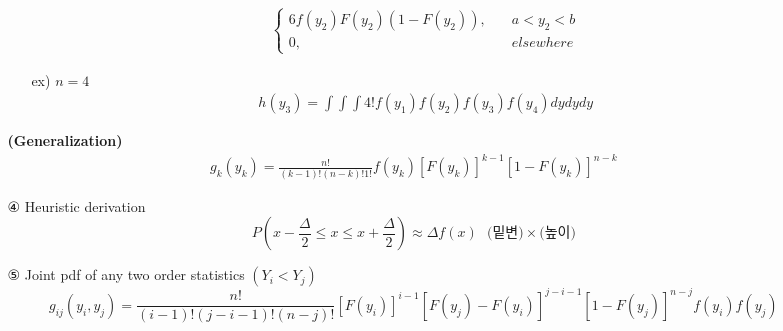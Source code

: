 \documentclass{oblivoir}
\begin{document}
\begin{itemize}
\begin{itemize}
\begin{itemize}
\begin{align*}
\begin{cases}
6f(y_2)F(y_2)(1-F(y_2)), \quad & a < y_2 < b\\
0, & elsewhere
\end{cases}
\end{align*}
\item[ex)] $n = 4$
\begin{align*}
h(y_3) = \int \int \int 4! f(y_1)f(y_2)f(y_3)f(y_4) dy dy dy
\end{align*}
\end{itemize}
\textbf{(Generalization)}
\begin{align*}
g_k(y_k) = \frac{n!}{(k-1)! (n-k)! 1!} f(y_k) [F(y_k)]^{k-1} [1-F(y_k)]^{n-k} 
\end{align*}

\item[④] Heuristic derivation
$$
P\left( x - \frac{\Delta}{2} \leq x \leq x + \frac{\Delta}{2} \right) \approx \Delta f(x) \mbox{~ (밑변)} \times  \mbox{(높이)}
$$

\item[⑤] Joint pdf of any two order statistics $(Y_i < Y_j)$
$$
g_{ij}(y_i, y_j) = \frac{n!}{(i-1)!(j-i-1)!(n-j)!} [F(y_i)]^{i-1} [F(y_j) - F(y_i)]^{j-i-1} [1-F(y_j)]^{n-j} f(y_i) f(y_j)
$$
\end{itemize}
\end{itemize}
\end{document}
